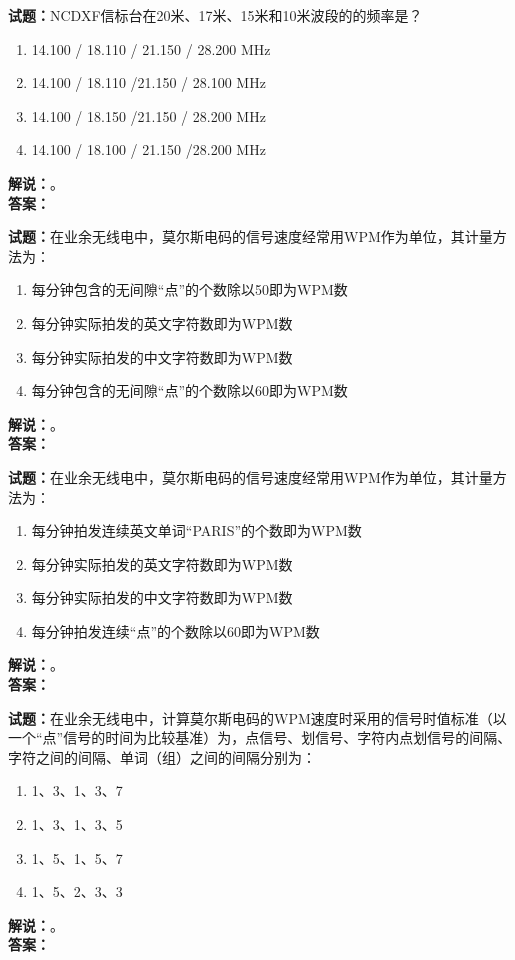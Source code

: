 \documentclass{ctexbook}
\begin{document}
\bigskip




\noindent\textbf{试题：}NCDXF信标台在20米、17米、15米和10米波段的的频率是？
\begin{enumerate}[leftmargin=3em]
\item 14.100 / 18.110 / 21.150 / 28.200 \unit{\MHz}
\item 14.100 / 18.110 /21.150 / 28.100 \unit{\MHz}
\item 14.100 / 18.150 /21.150 / 28.200 \unit{\MHz}
\item 14.100 / 18.100 / 21.150 /28.200 \unit{\MHz}
\end{enumerate}
\noindent\textbf{解说：}\textbf{}。\\\noindent\textbf{答案：}

\bigskip




\noindent\textbf{试题：}在业余无线电中，莫尔斯电码的信号速度经常用WPM作为单位，其计量方法为：
\begin{enumerate}[leftmargin=3em]
\item 每分钟包含的无间隙“点”的个数除以50即为WPM数
\item 每分钟实际拍发的英文字符数即为WPM数
\item 每分钟实际拍发的中文字符数即为WPM数
\item 每分钟包含的无间隙“点”的个数除以60即为WPM数
\end{enumerate}
\noindent\textbf{解说：}\textbf{}。\\\noindent\textbf{答案：}

\bigskip




\noindent\textbf{试题：}在业余无线电中，莫尔斯电码的信号速度经常用WPM作为单位，其计量方法为：
\begin{enumerate}[leftmargin=3em]
\item 每分钟拍发连续英文单词“PARIS”的个数即为WPM数
\item 每分钟实际拍发的英文字符数即为WPM数
\item 每分钟实际拍发的中文字符数即为WPM数
\item 每分钟拍发连续“点”的个数除以60即为WPM数
\end{enumerate}
\noindent\textbf{解说：}\textbf{}。\\\noindent\textbf{答案：}

\bigskip




\noindent\textbf{试题：}在业余无线电中，计算莫尔斯电码的WPM速度时采用的信号时值标准（以一个“点”信号的时间为比较基准）为，点信号、划信号、字符内点划信号的间隔、字符之间的间隔、单词（组）之间的间隔分别为：
\begin{enumerate}[leftmargin=3em]
\item 1、3、1、3、7
\item 1、3、1、3、5
\item 1、5、1、5、7
\item 1、5、2、3、3
\end{enumerate}
\noindent\textbf{解说：}\textbf{}。\\\noindent\textbf{答案：}
\end{document}
